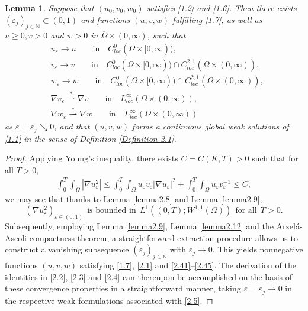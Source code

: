 \documentclass[12pt]{article}
\theoremstyle{plain}
\newtheorem{lemma}{Lemma}[section]
\theoremstyle{definition}
\numberwithin{equation}{section}
\begin{document}
\begin{lemma}\label{lemma2.15}
    Suppose that $(u_0,v_0,w_0)$ satisfies \eqref{1.2} and \eqref{1.6}. Then there exists
    $(\varepsilon_{j})_{j\in \mathbb{N}}\subset (0,1)$ and functions $(u, v, w)$ fulfilling \eqref{1.7}, as well as $u\geq 0, v>0$ and $w>0$ in $\overline{\Omega}\times(0,\infty)$,
such that
\begin{align}
    &u_{\varepsilon}\rightarrow{u}\qquad \text{in}\quad C_{loc}^{0}(\overline{\Omega}\times[0,\infty)),\label{2.41}\\
    &v_{\varepsilon}\rightarrow{v}\qquad \text{in}\quad C_{loc}^{0}(\overline{\Omega}\times[0,\infty))\cap C_{loc}^{2,1}(\overline{\Omega}\times(0,\infty)),\label{2.42}\\
    &w_{\varepsilon}\rightarrow{w}\qquad \text{in}\quad C_{loc}^{0}(\overline{\Omega}\times[0,\infty))\cap C_{loc}^{2,1}(\overline{\Omega}\times(0,\infty)),\label{2.43}\\
    &\nabla v_{\varepsilon}\stackrel{*}{\rightharpoonup}\nabla v\qquad  \text{in}\quad L_{loc}^{\infty}(\Omega\times(0,\infty)),\label{2.44}\\
    &\nabla w_{\varepsilon}\stackrel{*}{\rightharpoonup}\nabla w\qquad  \text{in}\quad L_{loc}^{\infty}(\Omega\times(0,\infty))\label{2.45}
\end{align}
as $\varepsilon=\varepsilon_{j}\searrow0$, and that $(u,v,w)$ forms a continuous global weak solutions of \eqref{1.1} in the sense of
Definition \ref{Definition 2.1}.
\end{lemma}
\begin{proof}
Applying Young's inequality, there exists $C=C(K,T)>0$ such that for all $T>0$,
    \begin{align*}
        \int_0^{T}\int_{\Omega}|\nabla u_{\varepsilon}^2|\leq \int_0^{T}\int_{\Omega}u_{\varepsilon}v_{\varepsilon}|\nabla u_{\varepsilon}|^2+\int_0^{T}\int_{\Omega}u_{\varepsilon}v_{\varepsilon}^{-1}\leq C,
    \end{align*}
    we may see that thanks to Lemma \ref{lemma2.8} and Lemma \ref{lemma2.9},
    $$(\nabla u_{\varepsilon}^2)_{\varepsilon\in(0,1)}~~ \mbox{is bounded in}~~L^1((0,T);W^{1,1}(\Omega))~~\mbox{for all}~~T>0.$$
Subsequently, employing Lemma \ref{lemma2.9}, Lemma \ref{lemma2.12} and the Arzel\'{a}-Ascoli compactness theorem, a straightforward extraction procedure allows us to construct a vanishing subsequence $(\varepsilon_{j})_{j\in \mathbb{N}}$ with $\varepsilon_{j}\to0$. This yields nonnegative functions $(u,v,w)$ satisfying \eqref{1.7}, \eqref{2.1} and \eqref{2.41}--\eqref{2.45}. The derivation of the identities in \eqref{2.2}, \eqref{2.3} and \eqref{2.4} can thereupon be accomplished on the basis of these convergence properties in a straightforward manner, taking $\varepsilon=\varepsilon_j\to0$ in the respective weak formulations associated with \eqref{2.5}.
\end{proof}
\end{document}
